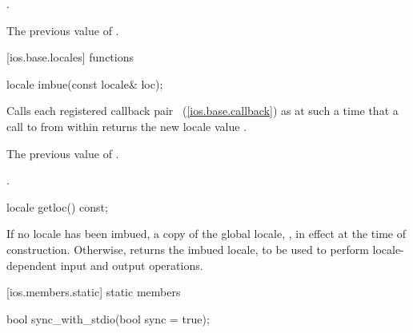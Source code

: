 \begin{itemdescr}
\pnum
\postconditions
{}.

\pnum
\returns
The previous value of
.
\end{itemdescr}

[ios.base.locales]{ functions}

%
\begin{itemdecl}
locale imbue(const locale& loc);
\end{itemdecl}

\begin{itemdescr}
\pnum
\effects
Calls each registered callback pair
~(\ref{ios.base.callback})
as
at such a time that a call to
from within
returns the new locale value
.

\pnum
\returns
The previous value of
.

\pnum
\postconditions
{}.
\end{itemdescr}

%
\begin{itemdecl}
locale getloc() const;
\end{itemdecl}

\begin{itemdescr}
\pnum
\returns
If no locale has been imbued, a copy of the global \Cpp locale,
,
in effect at the time of construction.
Otherwise, returns the imbued locale, to be used to
perform locale-dependent input and output operations.
\end{itemdescr}

[ios.members.static]{ static members}

%
\begin{itemdecl}
bool sync_with_stdio(bool sync = true);
\end{itemdecl}

